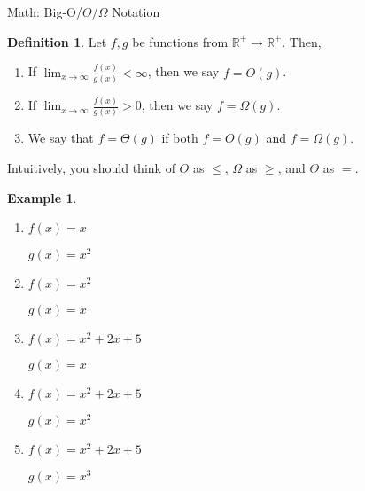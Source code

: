 \documentclass[10pt]{article}
\theoremstyle{definition}
\newtheorem{example}{Example}
\newtheorem{defn}{Definition}
\newcommand{\R}{\mathbb R}
\begin{document}
\begin{center}
    {
\Large
Math: Big-O/$\Theta$/$\Omega$ Notation
}
\end{center}


\begin{defn}
    Let $f,g$ be functions from $\R^+\to\R^+$.
    Then,
    \begin{enumerate}
        \item If $\displaystyle\lim_{x\to\infty} \frac{f(x)}{g(x)} < \infty$, then we say $f = O(g)$.
        \item If $\displaystyle\lim_{x\to\infty} \frac{f(x)}{g(x)} > 0$, then we say $f = \Omega(g)$.
        \item We say that $f = \Theta(g)$ if both $f=O(g)$ and $f=\Omega(g)$.
    \end{enumerate}
    Intuitively, you should think of $O$ as $\le$, $\Omega$ as $\ge$, and $\Theta$ as $=$.
\end{defn}

\begin{example}~
    \begin{enumerate}
        \item 
            $f(x) = x$
            
            $g(x) = x^2$
            \vspace{1in}
        \item
            $f(x) = x^2$
            
            $g(x) = x$
            \vspace{1in}
        \item
            $f(x) = x^2 + 2x + 5$
            
            $g(x) = x$
            \vspace{1in}
        \item
            $f(x) = x^2 + 2x + 5$
            
            $g(x) = x^2$
            \vspace{1in}
        \item
            $f(x) = x^2 + 2x + 5$
            
            $g(x) = x^3$
    \end{enumerate}
\end{example}
\end{document}
